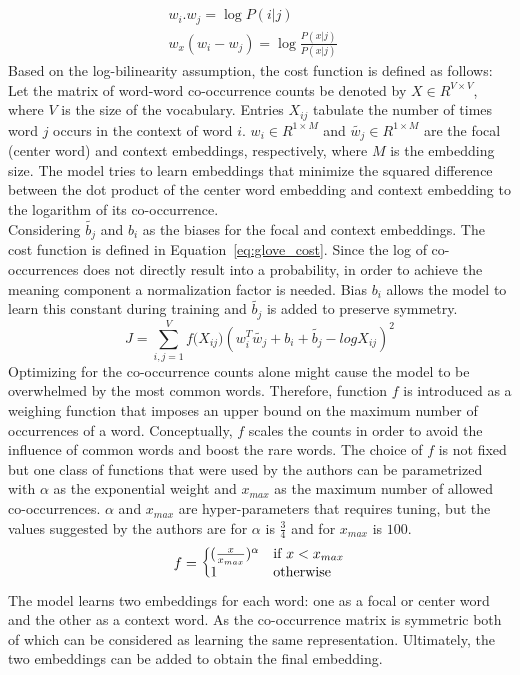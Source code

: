 \begin{equation}
\begin{split}
\\ w_{ i }.w_{ j }=\log { P(i|j)\quad  } \\ w_{ x }(w_{ i }-w_{ j })=\log { \frac { P(x|j) }{ P(x|j) } \quad  } 
\end{split}
\label{eq:log_prob}
\end{equation}
Based on the log-bilinearity assumption, the cost function is defined as follows:\\
Let the matrix of word-word co-occurrence counts be denoted by $X\in { R }^{ V\times V }$, where $V$ is the size of the vocabulary. Entries $X_{ij}$ tabulate the number of times word $j$ occurs in the context of word $i$. $w_{ i }\in { R }^{ 1\times M }$ and $\tilde{w_{ j }}\in { R }^{ 1\times M }$ are the focal (center word) and context embeddings, respectively, where $M$ is the embedding size. The model tries to learn embeddings that minimize the squared difference between the dot product of the center word embedding and context embedding to the logarithm of its co-occurrence.  \\
Considering $ \tilde{b_{ j }}$ and $b_{ i }$  as the biases for the focal and context embeddings. The cost function is defined in Equation~\ref{eq:glove_cost}.  Since the log of co-occurrences does not directly result into a probability, in order to achieve the meaning component a normalization factor is needed. Bias $b_{ i }$ allows the model to learn this constant during training and $ \tilde{b_{ j }}$ is added to preserve symmetry. 
\begin{equation}
J=\sum _{ i,j=1 }^{ V }{ f({ X }_{ ij } } )(w_{ i }^{ T }\tilde{  w_{ j } } +b_{ i }+\tilde{  b_{ j } } -log{ X }_{ ij })^2
\label{eq:glove_cost}
\end{equation}
Optimizing for the co-occurrence counts alone might cause the model to be overwhelmed by the most common words. Therefore, function $f$ is introduced as a weighing function that imposes an upper bound on the maximum number of occurrences of a word. Conceptually,  $f$ scales the counts in order to avoid the influence of common words and boost the rare words. The choice of $f$ is not fixed but one class of functions that were used by the authors can be parametrized with $\alpha$ as the exponential weight and $x_{max}$ as the maximum number of allowed co-occurrences. $\alpha$ and $x_{max}$ are hyper-parameters that requires tuning, but the values suggested by the authors are for $\alpha$ is $\frac{3}{4}$ and for $x_{max}$ is $100$. 
\begin{equation}
f=\left\{
  \begin{array}{@{}ll@{}}
    (\frac { x }{ { x }_{ max } } )^{ \alpha  }& \text{if}\ x<x_{max} \\
    1 & \text{otherwise}
  \end{array}\right.
\label{eq:weighingfunction}
\end{equation}
\noindent
The model learns two embeddings for each word: one as a focal or center word and the other as a context word. As the co-occurrence matrix is symmetric both of which can be considered as learning the same representation. Ultimately, the two embeddings can be added to obtain the final embedding.
